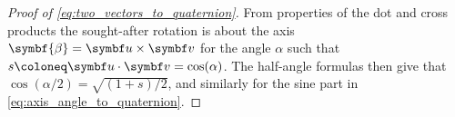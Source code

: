 \begin{proof}[Proof of \eqref{eq:two_vectors_to_quaternion}]
  From properties of the dot and cross products the sought-after rotation is about the axis $\symbf{\beta} = \bu \times \bv$ for the angle $\alpha$ such that $s \coloneq \bu \cdot \bv = \cos (\alpha)$. The half-angle formulas then give that $\cos (\alpha / 2) = \sqrt{(1 + s) / 2}$, and similarly for the sine part in \eqref{eq:axis_angle_to_quaternion}.
\end{proof}

